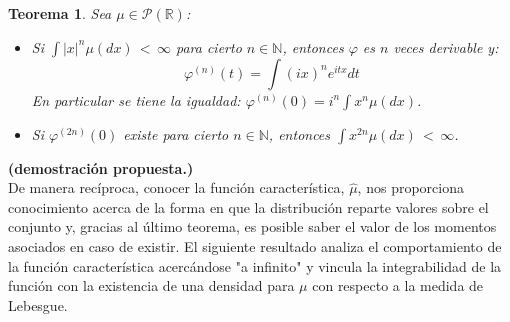 \documentclass[a4paper]{article}
\newtheorem{teorema}{Teorema}
\numberwithin{equation}{subsection}
\numberwithin{definicion}{subsection}
\def\R{\mathbb R}
\def\N{\mathbb N}
\begin{document}
\begin{teorema} Sea $\mu\in\mathcal{P}(\R)$:
\begin{itemize}
    \item Si $\int |x|^n \mu(dx)\,<\,\infty$ para cierto $n\in\N$, entonces $\varphi$ es $n$ veces derivable y:
    \[\varphi^{(n)}(t) =\int (ix)^n e^{itx}dt\]
    En particular se tiene la igualdad: $\varphi^{(n)}(0)=i^n \int x^n \mu(dx)$.
    \item Si $\varphi^{(2n)}(0)$ existe para cierto $n\in\N$, entonces $\int x^{2n}\mu(dx)\,<\,\infty$.
\end{itemize}
\end{teorema}
\textbf{(demostración propuesta.)}\\ \newline
De manera recíproca, conocer la función característica, $\hat{\mu}$, nos proporciona conocimiento acerca de la forma en que la distribución reparte valores sobre el conjunto y, gracias al último teorema, es posible saber el valor de los momentos asociados en caso de existir. El siguiente resultado analiza el comportamiento de la función característica acercándose "a infinito" y vincula la integrabilidad de la función con la existencia de una densidad para $\mu$ con respecto a la medida de Lebesgue.
\end{document}
